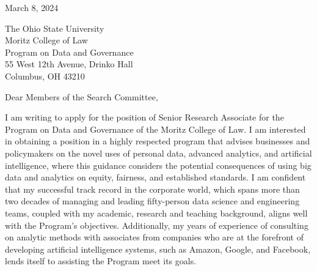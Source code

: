 

March 8, 2024\\

\vspace{2.0ex}

The Ohio State University \\
Moritz College of Law  \\
Program on Data and Governance \\
55 West 12th Avenue, Drinko Hall \\
Columbus, OH 43210 \\

\vspace{2.0ex}

Dear Members of the Search Committee, \\

\vspace{2.0ex}


I am writing to apply for the position of Senior Research Associate for the Program on Data and Governance of the Moritz College of Law. I am interested in obtaining a position in a highly respected program that advises businesses and policymakers on the novel uses of personal data, advanced analytics, and artificial intelligence, where this guidance considers the potential consequences of using big data and analytics on equity, fairness, and established standards.  I am confident that my successful track record in the corporate world, which spans more than two decades of managing and leading fifty-person data science and engineering teams, coupled with my academic, research and teaching background, aligns well with the Program's objectives.  Additionally, my years of experience of consulting on analytic methods with associates from companies who are at the forefront of developing artificial intelligence systems, such as Amazon, Google, and Facebook, lends itself to assisting the Program meet its goals. \\

\vspace{2.0ex}

